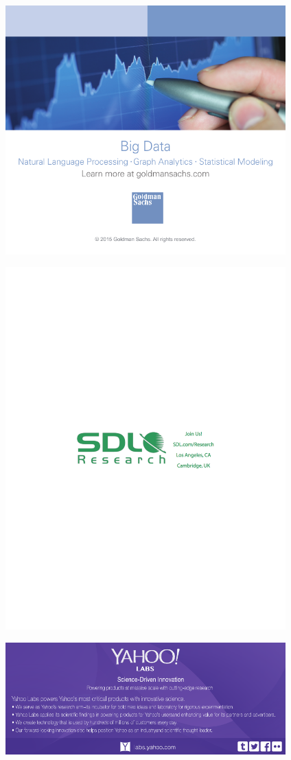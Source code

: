 \clearpage
\thispagestyle{empty}

\includegraphics[width=4.25in]{content/ads/gold/goldman_sachs.pdf}


\includegraphics[width=4.25in]{content/ads/silver/sdl_research.pdf}

\includegraphics[width=4.25in]{content/ads/bronze/yahoo_labs.pdf}
